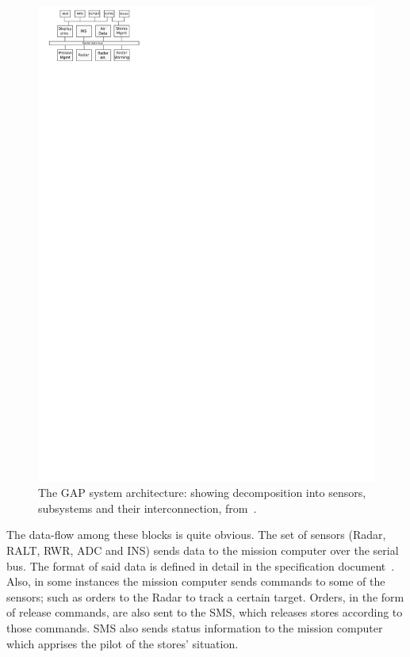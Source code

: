 \begin{figure}[htbp]
\centering
\includegraphics[scale=1.4]{figs/GAP_sys_arch}
\caption{The GAP system architecture: {\normalsize showing
  decomposition into sensors, subsystems and their interconnection,
  from~\cite{locke@rtss91}.}}
\label{fig:GAP}
\end{figure}

The data-flow among these blocks is quite obvious. The set of sensors
(Radar, RALT, RWR, ADC and INS) sends data to the mission computer
over the serial bus. The format of said data is defined in detail in
the specification document~\cite{locke@sei90}. Also, in some instances
the mission computer sends commands to some of the sensors; such as
orders to the Radar to track a certain target. Orders, in the form of
release commands, are also sent to the SMS, which releases stores
according to those commands. SMS also sends status information to the
mission computer which apprises the pilot of the stores' situation.

